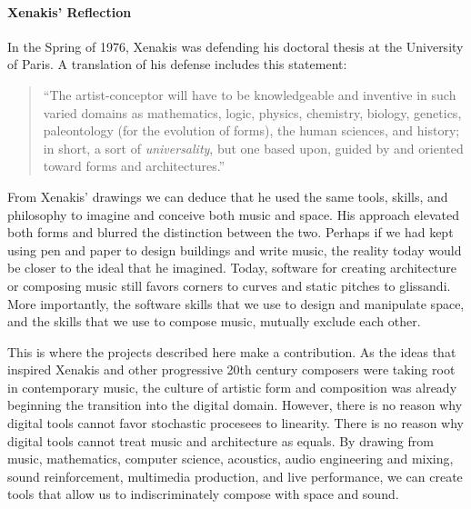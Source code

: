\paragraph{Xenakis' Reflection} In the Spring of 1976, Xenakis was
defending his doctoral thesis at the University of Paris. A
translation of his defense includes this statement:
\begin{quotation}
  ``The artist-conceptor will have to be knowledgeable and inventive
  in such varied domains as mathematics, logic, physics, chemistry,
  biology, genetics, paleontology (for the evolution of forms), the
  human sciences, and history; in short, a sort of
  \emph{universality}, but one based upon, guided by and oriented
  toward forms and architectures.''\cite{russolo1986art}
\end{quotation}
From Xenakis' drawings we can deduce that he used the same tools,
skills, and philosophy to imagine and conceive both music and
space. His approach elevated both forms and blurred the distinction
between the two. Perhaps if we had kept using pen and paper to design
buildings and write music, the reality today would be closer to the
ideal that he imagined. Today, software for creating architecture or
composing music still favors corners to curves and static pitches to
glissandi. More importantly, the software skills that we use to design
and manipulate space, and the skills that we use to compose music,
mutually exclude each other.

This is where the projects described here make a contribution. As the
ideas that inspired Xenakis and other progressive 20th century
composers were taking root in contemporary music, the culture of
artistic form and composition was already beginning the transition
into the digital domain. However, there is no reason why digital tools
cannot favor stochastic procesees to linearity. There is no reason why
digital tools cannot treat music and architecture as equals. By
drawing from music, mathematics, computer science, acoustics, audio
engineering and mixing, sound reinforcement, multimedia production,
and live performance, we can create tools that allow us to
indiscriminately compose with space and sound.

